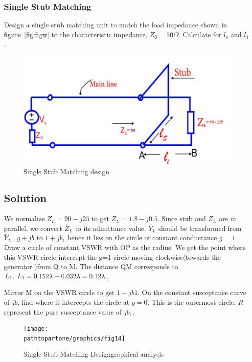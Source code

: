 \begin{exmp}
\subsubsection*{Single Stub Matching}
Design a single stub matching unit to match the load impedance shown in figure~\ref{fig:figw} to the characteristic impedance, $Z_0 = 50\varOmega$. Calculate for $l_s$ and $l_1$.
\begin{figure}[h]
\centering
\includegraphics[width=1\linewidth]{graphics/singleStubCalculation}
\caption{Single Stub Matching design}
\label{fig:singleStubCalculation}
\end{figure}

\subsection*{Solution}
We normalize $Z_L=90-j25$ to get 
$\bar{Z}_L=1.8-j0.5$. Since stub and $Z_L$ are in parallel,
we convert $\bar{Z}_L$ to its admittance value. $\bar{Y}_{L}$
should be transformed from 
$\bar{Y}_{L}$=$g+jb$ to $1+jb_1$ hence it lies on the circle of constant conductance $g=1$. Draw a circle of constant VSWR with OP as the radius. We get the point where this VSWR circle intercept the g=1 circle moving clockwise(towards the generator )from Q to M. The distance QM corresponds to $L_1.\hspace{0.15cm} L_1=0.152\lambda-0.032\lambda=0.12\lambda$.

Mirror M on the VSWR circle to get $1-jb1$. On the constant susceptance curve of $jb$, find where it intercepts the circle at $g=0$. This is the outermost circle. $R$ represent the pure susceptance value of $jb_1$. 
\begin{figure}[h]
\centering
\texttt{[image: \\pathtopartone/graphics/fig14]}
\caption{Single Stub Matching Design\textemdash\;graphical analysis}
\label{fig:fig14}
\end{figure}


\end{exmp}
